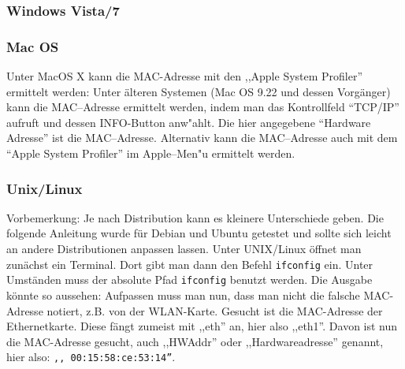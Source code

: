 \subsubsection*{Windows Vista/7}

\subsubsection*{Mac OS}
Unter MacOS X kann die MAC-Adresse mit den ,,Apple System Profiler''
ermittelt werden: %
Unter älteren Systemen (Mac OS 9.22 und dessen Vorgänger) kann 
die MAC--Adresse ermittelt werden, indem man das
Kontrollfeld "`TCP/IP"' aufruft und dessen INFO-Button anw"ahlt. Die hier
angegebene "`Hardware Adresse"' ist die MAC--Adresse. Alternativ kann die
MAC--Adresse auch mit dem "`Apple System Profiler"' im Apple--Men"u ermittelt
werden. 
\newpage
\subsubsection*{Unix/Linux}
\small{Vorbemerkung: Je nach Distribution kann es kleinere Unterschiede
geben. Die folgende Anleitung wurde für Debian und Ubuntu getestet und
sollte sich leicht an andere Distributionen anpassen lassen.} Unter
\glossar UNIX/Linux öffnet man zunächst ein Terminal. Dort gibt man
dann den Befehl \texttt{ifconfig} ein. Unter Umständen muss der
absolute Pfad \texttt{ifconfig} benutzt werden. Die Ausgabe könnte so
aussehen: %
Aufpassen muss man nun, dass man nicht die falsche MAC-Adresse
notiert, z.B. von der WLAN-Karte.
Gesucht ist die MAC-Adresse der Ethernetkarte. Diese fängt zumeist mit
,,eth'' an, hier also ,,eth1''.  Davon ist nun die MAC-Adresse
gesucht, auch ,,HWAddr'' oder ,,Hardwareadresse'' genannt, hier
also: \texttt{,, 00:15:58:ce:53:14''}. 

